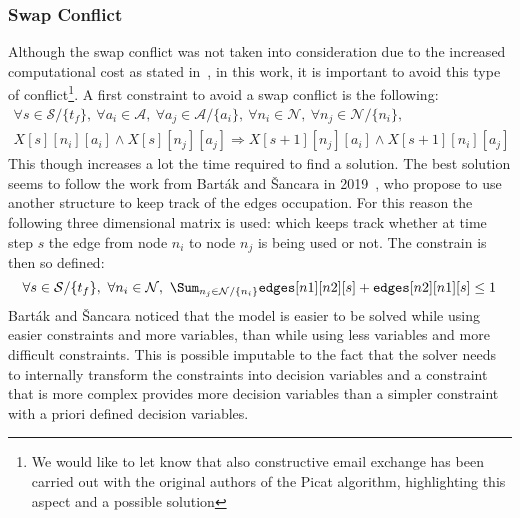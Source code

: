 \subsubsection{Swap Conflict}
Although the swap conflict was not taken into consideration due to the
increased computational cost as stated in~\cite{picat1}, in this work, it 
is important to avoid this type of conflict\footnote{We would like to let know 
that also constructive email exchange has been carried out with the original 
authors of the Picat algorithm, highlighting this aspect and a possible 
solution}. A first constraint to avoid a swap conflict is the following:
\begin{equation}
  \begin{split}
  \forall s \in\mathcal{S}/\{t_f\},~\forall a_i \in\mathcal{A},~\forall 
  a_j\in \mathcal{A}/\{a_i\},~\forall n_i \in \mathcal{N},~\forall n_j \in 
  \mathcal{N}/\{n_i\},\\
  X[s][n_i][a_i] \wedge X[s][n_j][a_j] \Rightarrow
  X[s+1][n_j][a_i]\wedge X[s+1][n_i][a_j]
  \end{split}
  \label{eq:cplex_no_swaps_no_edges}
\end{equation}
This though increases a lot the time required to find a solution. \newline 
The best solution seems to follow the work from Bart\'{a}k and \v{S}ancara in
2019~\cite{picat2}, who propose to use another structure to keep track of the
edges occupation. For this reason the following three dimensional matrix is
used:  which keeps track whether at time
step $s$ the edge from node $n_i$ to node $n_j$ is being used or not. \newline
The constrain is then so defined:
\begin{equation}
  \forall s \in \mathcal{S}/\{t_f\},~\forall n_i \in \mathcal{N},~\Sum_{n_j \in
  \mathcal{N}/\{n_i\}} \texttt{edges}[n1][n2][s] + \texttt{edges}[n2][n1][s]
  \leq 1
  \label{eq:cplex_no_swaps}
\end{equation}
Bart\'{a}k and \v{S}ancara noticed that the model is easier to be solved while
using easier constraints and more variables, than while using less variables
and more difficult constraints. This is possible imputable to the fact that the
solver needs to internally transform the constraints into decision variables
and a constraint that is more complex provides more decision variables than a
simpler constraint with a priori defined decision variables. 
%
